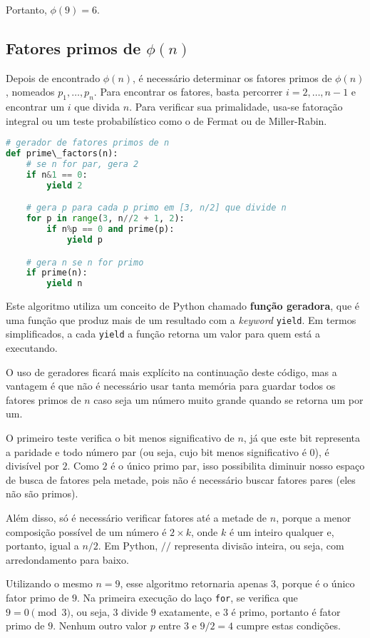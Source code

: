 \documentclass[12pt]{article}
\begin{document}
Portanto, $\phi(9) = 6$.

\subsection{Fatores primos de $\phi(n)$}

Depois de encontrado $\phi(n)$, é necessário determinar os fatores primos de
$\phi(n)$, nomeados $p_{1}, \ldots, p_{n}$. Para encontrar os fatores, basta
percorrer $i = 2, \ldots, n-1$ e encontrar um $i$ que divida $n$. Para
verificar sua primalidade, usa-se fatoração integral ou um teste probabilístico
como o de Fermat ou de Miller-Rabin.

\begin{lstlisting}[language=Python]
# gerador de fatores primos de n
def prime\_factors(n):
    # se n for par, gera 2
    if n&1 == 0:
        yield 2

    # gera p para cada p primo em [3, n/2] que divide n
    for p in range(3, n//2 + 1, 2):
        if n%p == 0 and prime(p):
            yield p

    # gera n se n for primo
    if prime(n):
        yield n
\end{lstlisting}

Este algoritmo utiliza um conceito de Python chamado \textbf{função geradora},
que é uma função que produz mais de um resultado com a \textit{keyword}
\texttt{yield}. Em termos simplificados, a cada \texttt{yield} a função retorna
um valor para quem está a executando.

O uso de geradores ficará mais explícito na continuação deste código, mas a
vantagem é que não é necessário usar tanta memória para guardar todos os
fatores primos de $n$ caso seja um número muito grande quando se retorna um por
um.

O primeiro teste verifica o bit menos significativo de $n$, já que este bit
representa a paridade e todo número par (ou seja, cujo bit menos significativo
é $0$), é divisível por $2$. Como $2$ é o único primo par, isso possibilita
diminuir nosso espaço de busca de fatores pela metade, pois não é necessário
buscar fatores pares (eles não são primos).

Além disso, só é necessário verificar fatores até a metade de $n$, porque a
menor composição possível de um número é $2 \times k$, onde $k$ é um inteiro
qualquer e, portanto, igual a $n / 2$. Em Python, $//$ representa divisão
inteira, ou seja, com arredondamento para baixo.

Utilizando o mesmo $n = 9$, esse algoritmo retornaria apenas $3$, porque é o
único fator primo de $9$. Na primeira execução do laço \texttt{for}, se
verifica que $9 = 0\pmod{3}$, ou seja, $3$ divide $9$ exatamente, e $3$ é
primo, portanto é fator primo de $9$. Nenhum outro valor $p$ entre $3$ e
$9/2=4$ cumpre estas condições.
\end{document}
